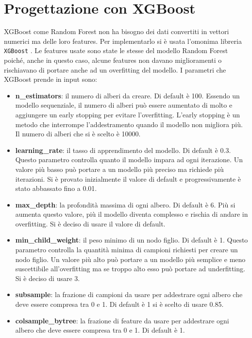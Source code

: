 \documentclass[12pt,a4paper,openright,twoside]{book}
\begin{document}
\section{Progettazione con XGBoost}
XGBoost come Random Forest non ha bisogno dei dati convertiti in vettori numerici
ma delle loro features.
Per implementarlo si è usata l'omonima libreria \texttt{XGBoost} \cite{xgboost_cl}.
Le features usate sono state le stesse del modello Random Forest poiché,
anche in questo caso, alcune features non davano miglioramenti o rischiavano
di portare anche ad un overfitting del modello.
I parametri che XGBoost prende in input sono:
\begin{itemize}
    \item \textbf{n\_estimators}: il numero di alberi da creare.
    Di default è 100. Essendo un modello sequenziale, il numero di alberi
    può essere aumentato di molto e aggiungere un early stopping
    per evitare l'overfitting. L'early stopping è un metodo che interrompe
    l'addestramento quando il modello non migliora più. Il numero
    di alberi che si è scelto è 10000.
    \item \textbf{learning\_rate}: il tasso di apprendimento del modello.
    Di default è 0.3. Questo parametro controlla quanto il modello
    impara ad ogni iterazione. Un valore più basso può portare a un modello
    più preciso ma richiede più iterazioni.
    Si è provato inizialmente il valore di default e progressivamente
    è stato abbassato fino a 0.01.
    \item \textbf{max\_depth}: la profondità massima di ogni albero.
    Di default è 6. Più si aumenta questo valore, più il modello
    diventa complesso e rischia di andare in overfitting.
    Si è deciso di usare il valore di default.
    \item \textbf{min\_child\_weight}: il peso minimo di un nodo figlio.
    Di default è 1. Questo parametro controlla la quantità minima
    di campioni richiesti per creare un nodo figlio. Un valore più alto
    può portare a un modello più semplice e meno suscettibile all'overfitting
    ma se troppo alto esso può portare ad underfitting.
    Si è deciso di usare 3.
    \item \textbf{subsample}: la frazione di campioni da usare per addestrare
    ogni albero che deve essere compresa tra 0 e 1. Di default è 1
    si è scelto di usare 0.85.
    \item \textbf{colsample\_bytree}: la frazione di feature da usare per addestrare
    ogni albero che deve essere compresa tra 0 e 1. Di default è 1.

\end{itemize}
\end{document}
